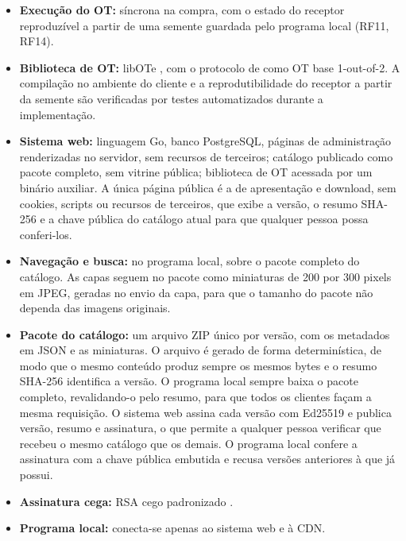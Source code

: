 \documentclass[12pt, oneside, a4paper, english, brazil]{abntex2}
\begin{document}
\begin{itemize}
\item \textbf{Execução do OT:} síncrona na compra, com o estado do receptor
reproduzível a partir de uma semente guardada pelo programa local (RF11,
RF14).

\item \textbf{Biblioteca de OT:} libOTe \cite{libote}, com o protocolo de
 como OT base 1-out-of-2. A compilação no ambiente
do cliente e a reprodutibilidade do receptor a partir da semente são
verificadas por testes automatizados durante a implementação.

\item \textbf{Sistema web:} linguagem Go, banco PostgreSQL, páginas de
administração renderizadas no servidor, sem recursos de terceiros; catálogo
publicado como pacote completo, sem vitrine pública; biblioteca de OT acessada
por um binário auxiliar. A única página pública é a de apresentação e
download, sem cookies, scripts ou recursos de terceiros, que exibe a versão,
o resumo SHA-256 e a chave pública do catálogo atual para que qualquer pessoa
possa conferi-los.

\item \textbf{Navegação e busca:} no programa local, sobre o pacote completo
do catálogo. As capas seguem no pacote como miniaturas de 200 por 300 pixels em
JPEG, geradas no envio da capa, para que o tamanho do pacote não dependa das
imagens originais.

\item \textbf{Pacote do catálogo:} um arquivo ZIP único por versão, com os
metadados em JSON e as miniaturas. O arquivo é gerado de forma
determinística, de modo que o mesmo conteúdo produz sempre os mesmos bytes e o
resumo SHA-256 identifica a versão. O programa local sempre baixa o pacote
completo, revalidando-o pelo resumo, para que todos os clientes façam a mesma
requisição. O sistema web assina cada versão com Ed25519 e publica versão,
resumo e assinatura, o que permite a qualquer pessoa verificar que recebeu o
mesmo catálogo que os demais. O programa local confere a assinatura com a
chave pública embutida e recusa versões anteriores à que já possui.

\item \textbf{Assinatura cega:} RSA cego padronizado \cite{rfc9474}.

\item \textbf{Programa local:} conecta-se apenas ao sistema web e à CDN.
\end{itemize}
\end{document}
